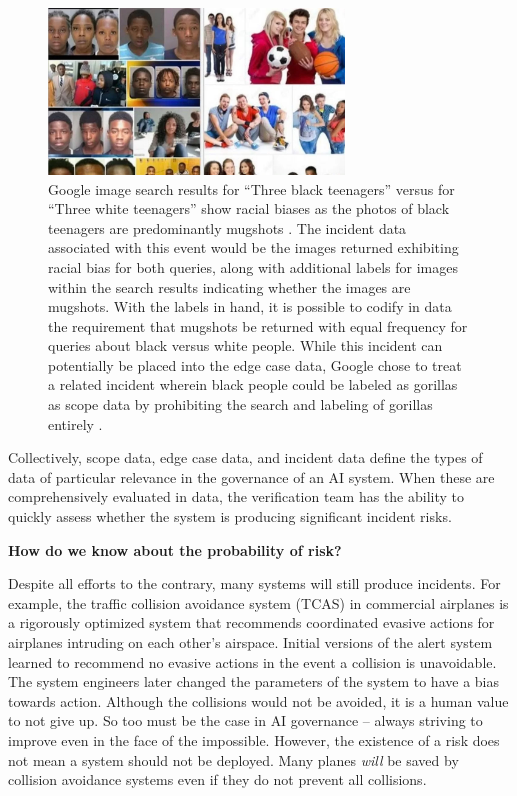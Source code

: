 \begin{figure}[ht]
    \centering
    \includegraphics[width=0.7\textwidth]{images/incidents/three_teenagers.jpg}
    \caption{Google image search results for ``Three black teenagers'' versus for ``Three white teenagers'' show racial biases as the photos of black teenagers are predominantly mugshots \cite{aiaaic_incident_2016}. The incident data associated with this event would be the images returned exhibiting racial bias for both queries, along with additional labels for images within the search results indicating whether the images are mugshots. With the labels in hand, it is possible to codify in data the requirement that mugshots be returned with equal frequency for queries about black versus white people. While this incident can potentially be placed into the edge case data, Google chose to treat a related incident wherein black people could be labeled as gorillas as scope data by prohibiting the search and labeling of gorillas entirely \cite{anonymous_incident_2015}.}
    \label{fig:teenagers}
\end{figure}

Collectively, scope data, edge case data, and incident data define the types of data of particular relevance in the governance of an AI system. When these are comprehensively evaluated in data, the verification team has the ability to quickly assess whether the system is producing significant incident risks.

\textbf{How do we know about the probability of risk?}

Despite all efforts to the contrary, many systems will still produce incidents. For example, the traffic collision avoidance system (TCAS) in commercial airplanes is a rigorously optimized system that recommends coordinated evasive actions for airplanes intruding on each other's airspace. Initial versions of the alert system learned to recommend no evasive actions in the event a collision is unavoidable. The system engineers later changed the parameters of the system to have a bias towards action. Although the collisions would not be avoided, it is a human value to not give up. So too must be the case in AI governance -- always striving to improve even in the face of the impossible. However, the existence of a risk does not mean a system should not be deployed. Many planes \textit{will} be saved by collision avoidance systems even if they do not prevent all collisions.

